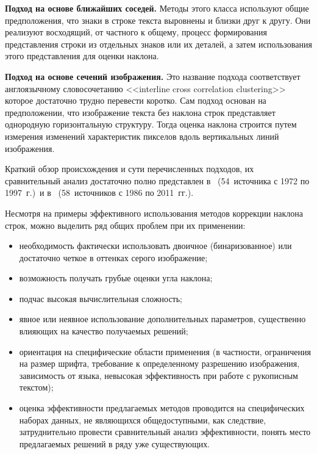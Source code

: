 \begin{multicols}{2}
      \smallskip
      
      \textbf{Подход на основе ближайших соседей.} Методы этого класса используют 
общие предположения, что знаки в строке текста выровнены и близки друг к другу. Они 
реализуют восходящий, от частного к общему, процесс формирования представления 
строки из отдельных знаков или их деталей, а затем использования этого представления 
для оценки наклона. 
      
      \smallskip
      
      \textbf{Подход на основе сечений изображения.} Это название подхода 
соответствует англоязычному словосочетанию <<interline cross correlation clustering>> 
которое достаточно трудно перевести коротко. Сам подход основан на предположении, 
что изображение текста без наклона строк представляет однородную горизонтальную 
структуру. Тогда оценка наклона строится путем измерения изменений характеристик 
пикселов вдоль вертикальных линий изображения.
      
      Краткий обзор происхождения и сути пе\-ре\-чис\-лен\-ных подходов, их сравнительный 
анализ достаточно полно представлен в~\cite{2-kr} (54~источника с 1972 по 1997~г.)\ и 
в~\cite{6-kr} (58~источников с 1986 по 2011~гг.).
      
      Несмотря на примеры эффективного использования методов коррекции наклона 
строк, можно выделить ряд общих проблем при их применении: 
      \begin{itemize}
\item необходимость фактически использовать двоичное (бинаризованное) или 
достаточно четкое в оттенках серого изображение; 
\item возможность получать грубые оценки угла наклона; 
\item подчас высокая вычислительная сложность; 
\item явное или неявное использование дополнительных параметров, существенно 
влияющих на качество получаемых решений;
\item ориентация на специфические области применения (в частности, ограничения на 
размер шрифта, требование к определенному разрешению изображения, зависимость 
от языка, невысокая эффективность при работе с рукописным текстом);
\item оценка эффективности предлагаемых методов проводится на специфических 
наборах данных, не являющихся общедоступными, как следствие, затруднительно 
провести сравнительный анализ эффективности, понять место предлагаемых решений 
в ряду уже существующих. 
\end{itemize}


\end{multicols}
